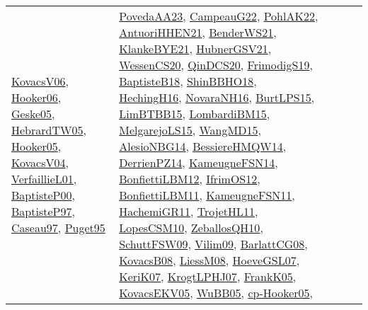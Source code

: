 {\begin{longtable}{lp{3cm}>{\raggedright}p{6cm}>{\raggedright}p{6cm}p{8cm}}
\href{papers/KovacsV06.pdf}{KovacsV06}\cite{KovacsV06}, \href{articles/Hooker06.pdf}{Hooker06}\cite{Hooker06}, \href{papers/Geske05.pdf}{Geske05}\cite{Geske05}, \href{papers/HebrardTW05.pdf}{HebrardTW05}\cite{HebrardTW05}, \href{articles/Hooker05.pdf}{Hooker05}\cite{Hooker05}, \href{papers/KovacsV04.pdf}{KovacsV04}\cite{KovacsV04}, \href{papers/VerfaillieL01.pdf}{VerfaillieL01}\cite{VerfaillieL01}, \href{articles/BaptisteP00.pdf}{BaptisteP00}\cite{BaptisteP00}, \href{papers/BaptisteP97.pdf}{BaptisteP97}\cite{BaptisteP97}, \href{papers/Caseau97.pdf}{Caseau97}\cite{Caseau97}, \href{papers/Puget95.pdf}{Puget95}\cite{Puget95} & \href{papers/PovedaAA23.pdf}{PovedaAA23}\cite{PovedaAA23}, \href{articles/CampeauG22.pdf}{CampeauG22}\cite{CampeauG22}, \href{articles/PohlAK22.pdf}{PohlAK22}\cite{PohlAK22}, \href{papers/AntuoriHHEN21.pdf}{AntuoriHHEN21}\cite{AntuoriHHEN21}, \href{papers/BenderWS21.pdf}{BenderWS21}\cite{BenderWS21}, \href{papers/KlankeBYE21.pdf}{KlankeBYE21}\cite{KlankeBYE21}, \href{articles/HubnerGSV21.pdf}{HubnerGSV21}\cite{HubnerGSV21}, \href{papers/WessenCS20.pdf}{WessenCS20}\cite{WessenCS20}, \href{articles/QinDCS20.pdf}{QinDCS20}\cite{QinDCS20}, \href{papers/FrimodigS19.pdf}{FrimodigS19}\cite{FrimodigS19}, \href{articles/BaptisteB18.pdf}{BaptisteB18}\cite{BaptisteB18}, \href{articles/ShinBBHO18.pdf}{ShinBBHO18}\cite{ShinBBHO18}, \href{papers/HechingH16.pdf}{HechingH16}\cite{HechingH16}, \href{articles/NovaraNH16.pdf}{NovaraNH16}\cite{NovaraNH16}, \href{papers/BurtLPS15.pdf}{BurtLPS15}\cite{BurtLPS15}, \href{papers/LimBTBB15.pdf}{LimBTBB15}\cite{LimBTBB15}, \href{papers/LombardiBM15.pdf}{LombardiBM15}\cite{LombardiBM15}, \href{papers/MelgarejoLS15.pdf}{MelgarejoLS15}\cite{MelgarejoLS15}, \href{articles/WangMD15.pdf}{WangMD15}\cite{WangMD15}, \href{papers/AlesioNBG14.pdf}{AlesioNBG14}\cite{AlesioNBG14}, \href{papers/BessiereHMQW14.pdf}{BessiereHMQW14}\cite{BessiereHMQW14}, \href{papers/DerrienPZ14.pdf}{DerrienPZ14}\cite{DerrienPZ14}, \href{articles/KameugneFSN14.pdf}{KameugneFSN14}\cite{KameugneFSN14}, \href{papers/BonfiettiLBM12.pdf}{BonfiettiLBM12}\cite{BonfiettiLBM12}, \href{papers/IfrimOS12.pdf}{IfrimOS12}\cite{IfrimOS12}, \href{papers/BonfiettiLBM11.pdf}{BonfiettiLBM11}\cite{BonfiettiLBM11}, \href{papers/KameugneFSN11.pdf}{KameugneFSN11}\cite{KameugneFSN11}, \href{articles/HachemiGR11.pdf}{HachemiGR11}\cite{HachemiGR11}, \href{articles/TrojetHL11.pdf}{TrojetHL11}\cite{TrojetHL11}, \href{articles/LopesCSM10.pdf}{LopesCSM10}\cite{LopesCSM10}, \href{articles/ZeballosQH10.pdf}{ZeballosQH10}\cite{ZeballosQH10}, \href{papers/SchuttFSW09.pdf}{SchuttFSW09}\cite{SchuttFSW09}, \href{papers/Vilim09.pdf}{Vilim09}\cite{Vilim09}, \href{papers/BarlattCG08.pdf}{BarlattCG08}\cite{BarlattCG08}, \href{articles/KovacsB08.pdf}{KovacsB08}\cite{KovacsB08}, \href{articles/LiessM08.pdf}{LiessM08}\cite{LiessM08}, \href{papers/HoeveGSL07.pdf}{HoeveGSL07}\cite{HoeveGSL07}, \href{papers/KeriK07.pdf}{KeriK07}\cite{KeriK07}, \href{papers/KrogtLPHJ07.pdf}{KrogtLPHJ07}\cite{KrogtLPHJ07}, \href{papers/FrankK05.pdf}{FrankK05}\cite{FrankK05}, \href{papers/KovacsEKV05.pdf}{KovacsEKV05}\cite{KovacsEKV05}, \href{papers/WuBB05.pdf}{WuBB05}\cite{WuBB05}, \href{papers/cp-Hooker05.pdf}{cp-Hooker05}\cite{cp-Hooker05}, 
\end{longtable}}
